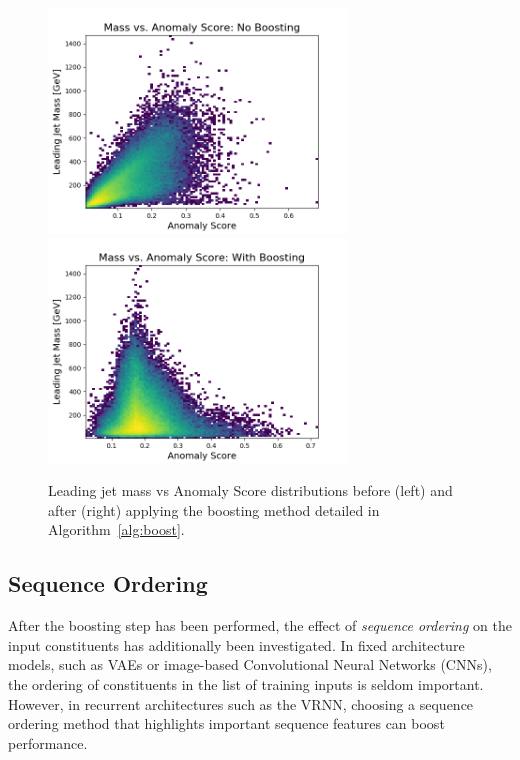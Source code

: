 \documentclass[12pt, a4paper]{article}
\begin{document}
\begin{figure}[H]
	\begin{center}
		\includegraphics[width=225pt]{imgs/ProcNoBoostPt_Background_July20_Background_July20_Weights_Leading_ConstOnly_Avg_M_vs_Score_ProcTest_SaveForPaper.png}
		\includegraphics[width=225pt]{imgs/ProcBoostPt_Background_July20_Background_July20_Weights_Leading_ConstOnly_Avg_M_vs_Score_ProcTest_SaveForPaper.png}
	\end{center}
	\caption{Leading jet mass vs Anomaly Score distributions before (left) and after (right) applying the boosting method detailed in Algorithm~\ref{alg:boost}.}
	\label{fig:mass_vs_score_boost}
\end{figure}


\subsection{Sequence Ordering}

After the boosting step has been performed, the effect of \textit{sequence ordering} on the input constituents has additionally been investigated. In fixed architecture models, such as VAEs or image-based Convolutional Neural Networks (CNNs), the ordering of constituents in the list of training inputs is seldom important. However, in recurrent architectures such as the VRNN, choosing a sequence ordering method that highlights important sequence features can boost performance.
 
\end{document}
